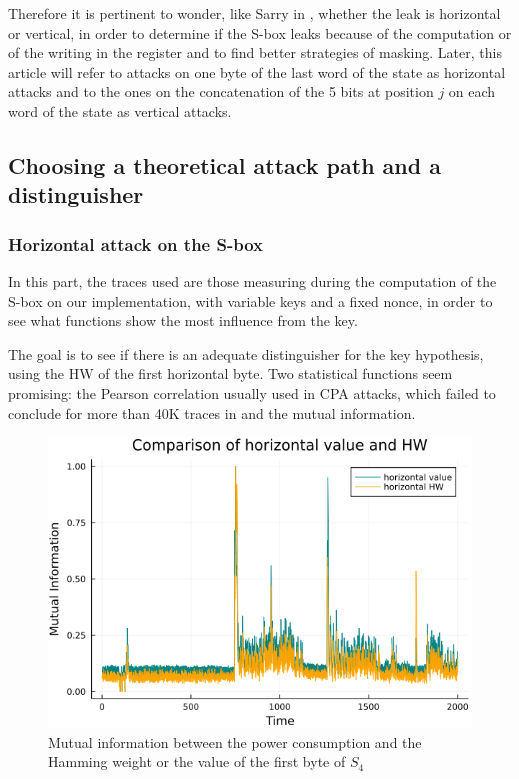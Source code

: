 \documentclass[a4paper,11pt,twocolumn]{article}
\begin{document}
	Therefore it is pertinent to wonder, like Sarry in \cite{these}, whether the leak is horizontal or vertical, in order to determine if the S-box leaks because of the computation or of the writing in the register and to find better strategies of masking. Later, this article will refer to attacks on one byte of the last word of the state as horizontal attacks and to the ones on the concatenation of the 5 bits at position $j$ on each word of the state as vertical attacks.
	
	\subsection{Choosing a theoretical attack path and a distinguisher} \label{choice}
	\subsubsection{Horizontal attack on the S-box}
	In this part, the traces used are those measuring during the computation of the S-box on our implementation, with variable keys and a fixed nonce, in order to see what functions show the most influence from the key.
	
	The goal is to see if there is an adequate distinguisher for the key hypothesis, using the HW of the first horizontal byte. Two statistical functions seem promising: the Pearson correlation usually used in CPA attacks, which failed to conclude for more than 40K traces in \cite{dl_cpa} and the mutual information.
	
	\begin{figure}[h]
		\centering
		\includegraphics[scale=0.4]{horizontal_one_byte}
		\caption{Mutual information between the power consumption and the Hamming weight or the value of the first byte of $S_4$}
		\label{hHW&val}
	\end{figure}
	
\end{document}
